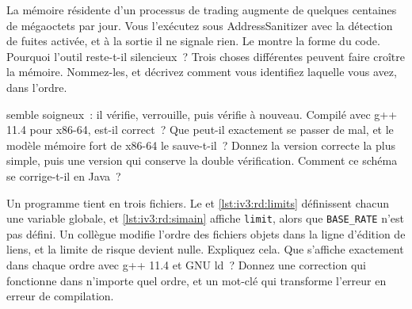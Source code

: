 \begin{question}\label{iq:iv3:reading-debugging-and-software-design:31}
La mémoire résidente d'un processus de trading augmente de quelques centaines de mégaoctets par jour. Vous l'exécutez sous AddressSanitizer avec la détection de fuites activée, et à la sortie il ne signale rien. Le  montre la forme du code. Pourquoi l'outil reste-t-il silencieux~? Trois choses différentes peuvent faire croître la mémoire. Nommez-les, et décrivez comment vous identifiez laquelle vous avez, dans l'ordre.
\label{lst:iv3:rd:growth}
\end{question}

\begin{question}\label{iq:iv3:reading-debugging-and-software-design:32}
 semble soigneux~: il vérifie, verrouille, puis vérifie à nouveau. Compilé avec g++ 11.4 pour x86-64, est-il correct~? Que peut-il exactement se passer de mal, et le modèle mémoire fort de x86-64 le sauve-t-il~? Donnez la version correcte la plus simple, puis une version qui conserve la double vérification. Comment ce schéma se corrige-t-il en Java~?
\label{lst:iv3:rd:dcl}
\end{question}

\begin{question}\label{iq:iv3:reading-debugging-and-software-design:33}
Un programme tient en trois fichiers. Le  et \cref{lst:iv3:rd:limits} définissent chacun une variable globale, et \cref{lst:iv3:rd:simain} affiche \texttt{limit}, alors que \texttt{BASE\_RATE} n'est pas défini. Un collègue modifie l'ordre des fichiers objets dans la ligne d'édition de liens, et la limite de risque devient nulle. Expliquez cela. Que s'affiche exactement dans chaque ordre avec g++ 11.4 et GNU ld~? Donnez une correction qui fonctionne dans n'importe quel ordre, et un mot-clé qui transforme l'erreur en erreur de compilation.
\label{lst:iv3:rd:rates}
\label{lst:iv3:rd:limits}
\label{lst:iv3:rd:simain}
\end{question}

